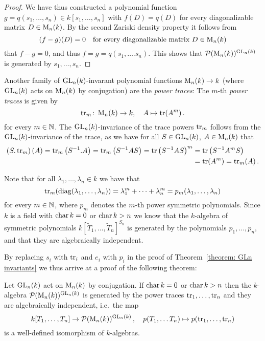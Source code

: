 \begin{proof}
  We have thus constructed a polynomial function $g = q(s_1, \dotsc, s_n) \in k[s_1, \dotsc, s_n]$ with $f(D) = q(D)$ for every diagonalizable matrix $D \in \operatorname{M}_n(k)$.
  By the second Zariski density property it follows from
  \[
    (f - g)(D) = 0
    \quad
    \text{for every diagonalizable matrix $D \in \operatorname{M}_n(k)$}
  \]
  that $f - g = 0$, and thus $f = g = q(s_1, \dotsc. s_n)$.
  This shows that $\mathcal{P}(\operatorname{M}_n(k))^{\operatorname{GL}_n(k)}$ is generated by $s_1, \dotsc, s_n$.
\end{proof}


\begin{fluff}
  Another family of $\operatorname{GL}_n(k)$-invarant polynomial functions $\operatorname{M}_n(k) \to k$ (where $\operatorname{GL}_n(k)$ acts on $\operatorname{M}_n(k)$ by conjugation) are the \emph{power traces}:
  The $m$-th \emph{power traces} is given by
  \[
            \operatorname{tr}_m
    \colon  \operatorname{M}_n(k)
    \to     k,
    \quad    A
    \mapsto \operatorname{tr}(A^m)  \,.
  \]
  for every $m \in \mathbb{N}$.
  The $\operatorname{GL}_n(k)$-invariance of the trace powers $\operatorname{tr}_m$ follows from the $\operatorname{GL}_n(k)$-invariance of the trace, as we have for all $S \in \operatorname{GL}_n(k)$, $A \in \operatorname{M}_n(k)$ that
    \begin{align*}
        \left( S.\operatorname{tr}_m \right)(A)
     =  \operatorname{tr}_m\left( S^{-1}.A \right)
     =  \operatorname{tr}_m\left( S^{-1} A S \right)
     =  \operatorname{tr} \left( S^{-1} A S \right)^m
    &=  \operatorname{tr} \left( S^{-1} A^m S \right) \\
    &=  \operatorname{tr}(A^m)
     =  \operatorname{tr}_m(A) \,.
  \end{align*}
  
  Note that for all $\lambda_1, \dotsc, \lambda_n \in k$ we have that
  \[
      \operatorname{tr}_m(\operatorname{diag}(\lambda_1, \dotsc, \lambda_n))
    = \lambda_1^m + \dotsb + \lambda_n^m
    = p_m(\lambda_1, \dotsc, \lambda_n)
  \]
  for every $m \in \mathbb{N}$, where $p_m$ denotes the $m$-th power symmetric polynomials.
  Since $k$ is a field with $\operatorname{char} k = 0$ or $\operatorname{char} k > n$ we know that the $k$-algebra of symmetric polynomials $k[\tilde{T}_1, \dotsc, \tilde{T}_n]^{S_n}$ is generated by the polynomials $p_1, \dotsc, p_n$, and that they are algebraically independent.
  
  By replacing $s_i$ with $\operatorname{tr}_i$ and $e_i$ with $p_i$ in the proof of Theorem~\ref{theorem: GLn invariants} we thus arrive at a proof of the following theorem:
\end{fluff}


\begin{theorem}
  Let $\operatorname{GL}_n(k)$ act on $\operatorname{M}_n(k)$ by conjugation.
  If $\operatorname{char} k = 0$ or $\operatorname{char} k > n$ then the $k$-algebra $\mathcal{P}(\operatorname{M}_n(k))^{\operatorname{GL}_n(k)}$ is generated by the power traces $\operatorname{tr}_1, \dotsc, \operatorname{tr}_n$ and they are algebraically independent, i.e.\ the map
   \[
            k[T_1, \dotsc, T_n]
    \to     \mathcal{P}(\operatorname{M}_n(k))^{\operatorname{GL}_n(k)} \,,
    \quad   p(T_1, \dotsc T_n)
    \mapsto p(\operatorname{tr}_1, \dotsc, \operatorname{tr}_n)
  \]
  is a well-defined isomorphism of $k$-algebras.
\end{theorem}




